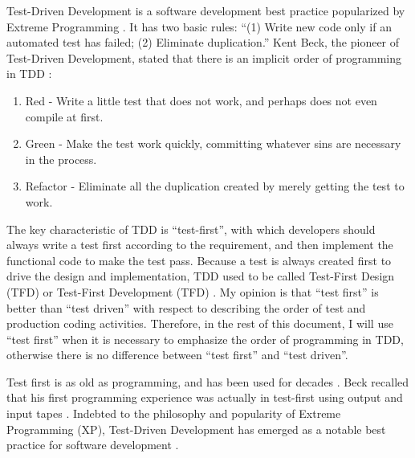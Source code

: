 \begin{comment}

Test-Driven Development\cite{Beck:03} is a software development practice
popularized by Extreme Programming \cite{Beck:00,Jeffries:00}. The key
characteristic of TDD is ``test-first'', in which developers should 
always write a test first according to the requirement, and then implement
the functional code to make the test pass. Because a test is always created 
first to drive the design and implementation, TDD used to be called Test-First 
Design (TFD) or Test-First Development (TFD) \cite{Beck:00}. 
\end{comment}

Test-Driven Development\cite{Beck:03} is a software development 
best practice popularized by Extreme Programming \cite{Jeffries:00,Beck:00}. 
It has two basic rules: ``(1) Write new code only if an automated test
has failed; (2) Eliminate duplication.''  Kent Beck, the pioneer of
Test-Driven Development, stated that there is an implicit order of 
programming in TDD \cite{Beck:03}: 
\begin{enumerate}
\item Red - Write a little test that does not work, and perhaps does not even
  compile at first.
\item Green - Make the test work quickly, committing whatever sins are
  necessary in the process.
\item Refactor - Eliminate all the duplication created by merely getting
  the test to work.
\end{enumerate}
The key characteristic of TDD is ``test-first'', with which developers 
should always write a test first according to the requirement, and then 
implement the functional code to make the test pass. Because a test is 
always created first to drive the design and implementation, TDD used 
to be called Test-First Design (TFD) or Test-First Development 
(TFD) \cite{Beck:00}. My opinion is that ``test first'' is better 
than ``test driven'' with respect to describing the order of test and 
production coding activities. Therefore, in the rest of this document, 
I will use ``test first'' when it is necessary to emphasize the order of 
programming in TDD, otherwise there is no difference between ``test first''
and ``test driven''.

Test first is as old as programming, and has been used for decades
 \cite{Williams:03,Beck:00,Beck:01}. Beck recalled that his first 
programming experience was actually in test-first using output and
input tapes \cite{Beck:01}. Indebted to the philosophy and popularity 
of Extreme Programming (XP), Test-Driven Development has emerged as a 
notable best practice for software development 
\cite{Beck:00,Jeffries:00}.

